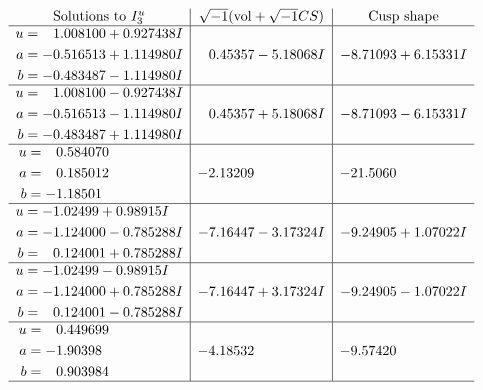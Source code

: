 \documentclass[1p]{elsarticle_modified}
\theoremstyle{definition}
\newcommand{\I}{\sqrt{-1}}
\begin{document}
$$\begin{array}{c|c|c}  
\text{Solutions to }I^u_{3}& \I (\text{vol} + \sqrt{-1}CS) & \text{Cusp shape}\\
 \hline 
\begin{aligned}
u &= \phantom{-}1.008100 + 0.927438 I \\
a &= -0.516513 + 1.114980 I \\
b &= -0.483487 - 1.114980 I\end{aligned}
 & \phantom{-}0.45357 - 5.18068 I & -8.71093 + 6.15331 I \\ \hline\begin{aligned}
u &= \phantom{-}1.008100 - 0.927438 I \\
a &= -0.516513 - 1.114980 I \\
b &= -0.483487 + 1.114980 I\end{aligned}
 & \phantom{-}0.45357 + 5.18068 I & -8.71093 - 6.15331 I \\ \hline\begin{aligned}
u &= \phantom{-}0.584070\phantom{ +0.000000I} \\
a &= \phantom{-}0.185012\phantom{ +0.000000I} \\
b &= -1.18501\phantom{ +0.000000I}\end{aligned}
 & -2.13209\phantom{ +0.000000I} & -21.5060\phantom{ +0.000000I} \\ \hline\begin{aligned}
u &= -1.02499 + 0.98915 I \\
a &= -1.124000 - 0.785288 I \\
b &= \phantom{-}0.124001 + 0.785288 I\end{aligned}
 & -7.16447 - 3.17324 I & -9.24905 + 1.07022 I \\ \hline\begin{aligned}
u &= -1.02499 - 0.98915 I \\
a &= -1.124000 + 0.785288 I \\
b &= \phantom{-}0.124001 - 0.785288 I\end{aligned}
 & -7.16447 + 3.17324 I & -9.24905 - 1.07022 I \\ \hline\begin{aligned}
u &= \phantom{-}0.449699\phantom{ +0.000000I} \\
a &= -1.90398\phantom{ +0.000000I} \\
b &= \phantom{-}0.903984\phantom{ +0.000000I}\end{aligned}
 & -4.18532\phantom{ +0.000000I} & -9.57420\phantom{ +0.000000I}\\
 \hline 
 \end{array}$$\newpage
\end{document}
